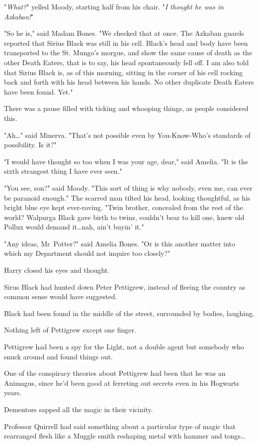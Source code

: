 "\emph{What?}" yelled Moody, starting half from his chair. "\emph{I thought he
was in Azkaban!}"

"So he is," said Madam Bones. "We checked that at once. The Azkaban guards
reported that Sirius Black was still in his cell. Black's head and body have
been transported to the St. Mungo's morgue, and show the same cause of death as
the other Death Eaters, that is to say, his head spontaneously fell off. I am
also told that Sirius Black is, as of this morning, sitting in the corner of
his cell rocking back and forth with his head between his hands. No other
duplicate Death Eaters have been found. Yet."

There was a pause filled with ticking and whooping things, as people considered
this.

"Ah…" said Minerva. "That's not possible even by You-Know-Who's
standards of possibility. Is it?"

"I would have thought so too when I was your age, dear," said Amelia. "It is
the sixth strangest thing I have ever seen."

"You see, son?" said Moody. "This sort of thing is why nobody, even me, can
ever be paranoid enough." The scarred man tilted his head, looking thoughtful,
as his bright blue eye kept ever-roving. "Twin brother, concealed from the rest
of the world? Walpurga Black gave birth to twins, couldn't bear to kill one,
knew old Pollux would demand it…nah, ain't buyin' it."

"Any ideas, Mr~Potter?" said Amelia Bones. "Or is this another matter into
which my Department should not inquire too closely?"

Harry closed his eyes and thought.

Sirus Black had hunted down Peter Pettigrew, instead of fleeing the country as
common sense would have suggested.

Black had been found in the middle of the street, surrounded by bodies,
laughing.

Nothing left of Pettigrew except one finger.

Pettigrew had been a spy for the Light, not a double agent but somebody who
snuck around and found things out.

One of the conspiracy theories about Pettigrew had been that he was an
Animagus, since he'd been good at ferreting out secrets even in his Hogwarts
years.

Dementors sapped all the magic in their vicinity.

Professor Quirrell had said something about a particular type of magic that
rearranged flesh like a Muggle smith reshaping metal with hammer and
tongs…

